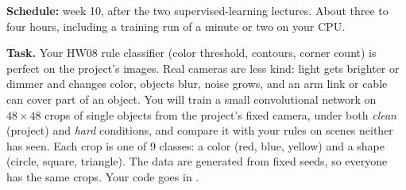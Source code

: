 

\textbf{Schedule:} week 10, after the two supervised-learning lectures.
About three to four hours, including a training run of a minute or two on
your CPU.

\textbf{Task.} Your HW08 rule classifier (color threshold, contours, corner
count) is perfect on the project's images. Real cameras are less kind: light
gets brighter or dimmer and changes color, objects blur, noise grows, and an
arm link or cable can cover part of an object. You will train a small
convolutional network on $48\times48$ crops of single objects from the
project's fixed camera, under both \emph{clean} (project) and \emph{hard}
conditions, and compare it with your rules on scenes neither has seen. Each
crop is one of 9 classes: a color (red, blue, yellow) and a shape (circle,
square, triangle). The data are generated from fixed seeds, so everyone has
the same crops. Your code goes in .


